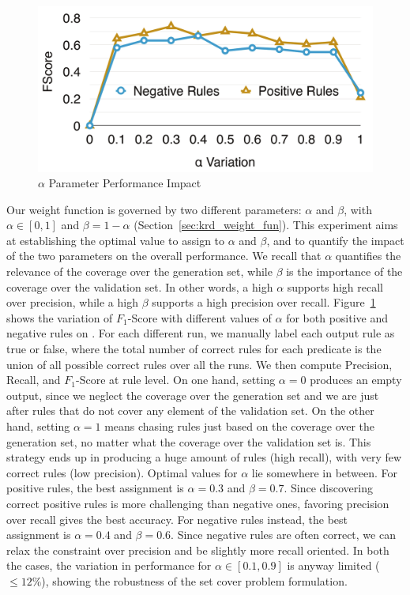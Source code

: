 \begin{figure}[htb]
	\centering
	\includegraphics[width=0.9\columnwidth]{include/figure/alpha_impact.pdf}
	\caption{$\alpha$ Parameter Performance Impact}
	\label{fig:alpha_impact}
\end{figure}
Our weight function is governed by two different parameters: $\alpha$ and $\beta$, with $\alpha \in [0,1]$ and $\beta=1-\alpha$ (Section~\ref{sec:krd_weight_fun}). This experiment aims at establishing the optimal value to assign to $\alpha$ and $\beta$, and to quantify the impact of the two parameters on the overall performance. We recall that $\alpha$ quantifies the relevance of the coverage over the generation set, while $\beta$ is the importance of the coverage over the validation set. In other words, a high $\alpha$ supports high recall over precision, while a high $\beta$ supports a high precision over recall. Figure~\ref{fig:alpha_impact} shows the variation of \textsf{$F_1$-Score} with different values of $\alpha$ for both positive and negative rules on \dbpedia. For each different run, we manually label each output rule as true or false, where the total number of correct rules for each predicate is the union of all possible correct rules over all the runs. We then compute \textsf{Precision}, \textsf{Recall}, and \textsf{$F_1$-Score} at rule level. On one hand, setting $\alpha=0$ produces an empty output, since we neglect the coverage over the generation set and we are just after rules that do not cover any element of the validation set. On the other hand, setting $\alpha=1$ means chasing rules just based on the coverage over the generation set, no matter what the coverage over the validation set is. This strategy ends up in producing a huge amount of rules (high recall), with very few correct rules (low precision). Optimal values for  $\alpha$  lie somewhere in between. For positive rules, the best assignment is $\alpha=0.3$ and $\beta=0.7$. Since discovering correct positive rules is more challenging than negative ones, favoring precision over recall gives the best accuracy. For negative rules instead, the best assignment is $\alpha=0.4$ and $\beta=0.6$. Since negative rules are often correct, we can relax the constraint over precision and be slightly more recall oriented. In both the cases, the variation in performance for $\alpha \in [0.1,0.9]$ is anyway limited ($\leq 12\%$), showing the robustness of the set cover problem formulation.

